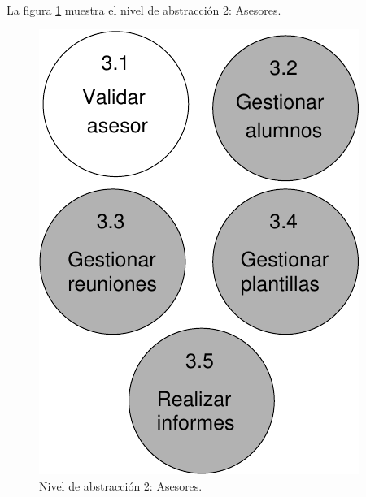 \paragraph{}La figura \ref{diagramaNivel2-Asesores} muestra el nivel de
abstracción 2: Asesores.

  \begin{figure}[!ht]
    \begin{center}
      \includegraphics[]{08.Analisis_Funcional/8.2.DFDs/Niveles/Nivel2/Diagramas/nivel2-Asesores.pdf}
      \caption{Nivel de abstracción 2: Asesores.}
      \label{diagramaNivel2-Asesores}
    \end{center}
  \end{figure}
